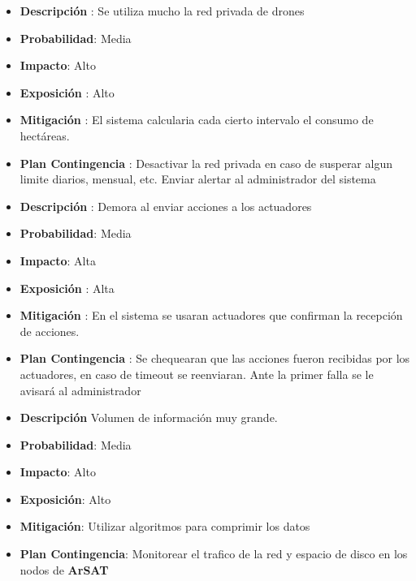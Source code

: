 \begin{itemize}
 \item \textbf{Descripci\'on} : Se utiliza mucho la red privada de drones
 \item \textbf{Probabilidad}: Media
 \item \textbf{Impacto}: Alto
 \item \textbf{Exposición} : Alto
 \item \textbf{Mitigación} : El sistema calcularia cada cierto intervalo el consumo de hect\'areas.
 \item \textbf{Plan Contingencia} : Desactivar la red privada en caso de susperar algun limite diarios, mensual, etc. Enviar alertar al administrador del sistema
 
\end{itemize}

\begin{itemize}
 \item \textbf{Descripci\'on} : Demora al enviar acciones a los actuadores
 \item \textbf{Probabilidad}: Media
 \item \textbf{Impacto}: Alta
 \item \textbf{Exposición} : Alta
 \item \textbf{Mitigación} : En el sistema se usaran actuadores que confirman la recepci\'on de acciones.
 \item \textbf{Plan Contingencia} : Se chequearan que las acciones fueron recibidas por los actuadores, en caso de timeout se reenviaran. Ante la primer falla se le avisar\'a al administrador
 
\end{itemize}

\begin{itemize}
 \item \textbf{Descripci\'on} Volumen de informaci\'on muy grande.
 \item \textbf{Probabilidad}: Media
 \item \textbf{Impacto}: Alto
 \item \textbf{Exposición}: Alto
 \item \textbf{Mitigación}: Utilizar algoritmos para comprimir los datos
 \item \textbf{Plan Contingencia}: Monitorear el trafico de la red y espacio de disco en los nodos de \textbf{ArSAT}
 
\end{itemize}